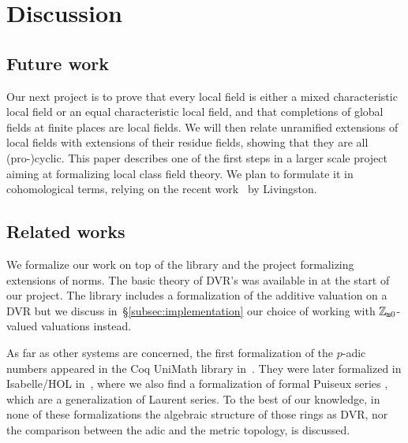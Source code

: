 \documentclass[sigplan,10pt,anonymous,review]{acmart}
\begin{document}
\section{Discussion}\label{sec:conclusion}

\subsection{Future work}\label{subsec:future_work}

Our next project is to prove that every local field is either a mixed characteristic local field or an equal characteristic local field, and that completions of global fields at finite places are local fields. We will then relate unramified extensions of local fields with extensions of their residue fields, showing that they are all (pro-)cyclic. This paper describes one of the first steps in a larger scale project aiming at formalizing local class field theory. We plan to formulate it in cohomological terms, relying on the recent work~\cite{Liv23} by Livingston.

\subsection{Related works}\label{subsec:related_work}
We formalize our work on top of the \lean library \mathlib and the \lean project \cite{deF23} formalizing extensions of norms. The basic theory of DVR's was available in \mathlib at the start of our project. The library includes a formalization of the additive valuation on a DVR but we discuss in~\S\ref{subsec:implementation} our choice of working with $\mathbb{Z}_{\mathtt{m}0}$-valued valuations instead.

As far as other systems are concerned, the first formalization of the $p$-adic numbers appeared in the Coq UniMath library in~\cite{padicsCoq}. They were later formalized in Isabelle/HOL in~\cite{padicIsa}, where we also find a formalization of formal Puiseux series \cite{PuiseuxSeriesIsa}, which are a generalization of Laurent series. To the best of our knowledge, in none of these formalizations the algebraic structure of those rings as DVR, nor the comparison between the adic and the metric topology, is discussed. %
\end{document}
